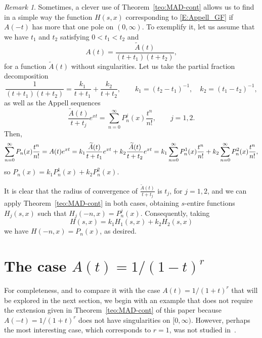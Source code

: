 \documentclass[11pt,a4paper]{amsart}
\theoremstyle{plain}
\theoremstyle{plain}
\theoremstyle{remark}
\newtheorem{remark}{Remark}
\numberwithin{equation}{section}
\begin{document}
\begin{remark}
Sometimes, a clever use of Theorem~\ref{teo:MAD-cont} allows us to find in a simple way the function $H(s,x)$ corresponding to \eqref{E:Appell_GF} if $A(-t)$ has more that one pole on $(0,\infty)$. To exemplify it, let us assume that we have $t_1$ and $t_2$ satisfying $0<t_1<t_2$ and
\[
  A(t) = \frac{\widetilde{A}(t)}{(t+t_1)(t+t_2)},
\]
for a function $\widetilde{A}(t)$ without singularities. 
Let us take the partial fraction decomposition
\[
\frac{1}{(t+t_1)(t+t_2)} = \frac{k_1}{t+t_1} + \frac{k_2}{t+t_2},
\qquad k_1=(t_2-t_1)^{-1}, \quad k_2=(t_1-t_2)^{-1},
\]
as well as the Appell sequences
\[
  \frac{\widetilde{A}(t)}{t+t_j}e^{xt} = \sum_{n=0}^{\infty} P_n^j(x)\frac{t^n}{n!},
  \qquad j=1,2.
\]
Then,
\begin{equation*}
  \sum_{n=0}^{\infty} P_n(x)\frac{t^n}{n!} = A(t) e^{xt}
  = k_1 \frac{\widetilde{A}(t)}{t+t_1}e^{xt} 
  + k_2\frac{\widetilde{A}(t)}{t+t_2}e^{xt} \\
  = k_1 \sum_{n=0}^{\infty} P^{1}_n(x)\frac{t^n}{n!} 
  + k_2 \sum_{n=0}^{\infty} P^{2}_n(x)\frac{t^n}{n!},
\end{equation*}
so $P_n(x) = k_1 P^{1}_n(x) + k_2 P^{2}_n(x)$.

It is clear that the radius of convergence of $\frac{\tilde{A}(t)}{t+t_j}$ is $t_j$, for $j=1,2$, and we can apply Theorem~\ref{teo:MAD-cont} in both cases, obtaining  $s$-entire functions $H_j(s,x)$ such that $H_j(-n,x) = P^{j}_n(x)$. Consequently, taking
\[
H(s,x) = k_1 H_1(s,x) + k_2 H_2(s,x)
\]
we have $H(-n,x) = P_n(x)$, as desired.
\end{remark}

\section{The case $A(t) = 1/(1-t)^r$}
\label{sec:1-tr}

For completeness, and to compare it with the case $A(t) = 1/(1+t)^r$ that will be explored in the next section, we begin with an example that does not require the extension given in Theorem~\ref{teo:MAD-cont} of this paper because $A(-t) = 1/(1+t)^r$ does not have singularities on $[0,\infty)$. However, perhaps the most interesting case, which corresponds to $r=1$, was not studied in~\cite{NRV}. 
\end{document}
